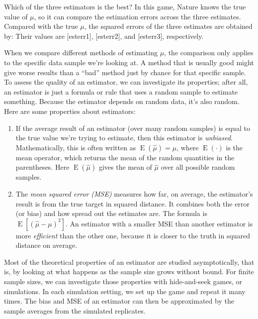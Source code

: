Which of the three estimators is the best? In this game, Nature knows the true
value of $\mu$, so it can compare the estimation errors across the three
estimates. Compared with the true $\mu$, the squared errors of the three
estimates are obtained by:
Their values are [esterr1],
[esterr2], and
[esterr3], respectively.


When we compare different methods of estimating $\mu$, the comparison only
applies to the specific data sample we're looking at. A method that is usually
good might give worse results than a ``bad'' method just by chance for that
specific sample.  To assess the quality of an estimator, we can investigate its
properties; after all, an estimator is just a formula or rule that uses a random
sample to estimate something. Because the estimator depends on random data, it's
also random. Here are some properties about estimators:
\begin{enumerate}
\item If the average result of an estimator (over many random samples) is equal
  to the true value we're trying to estimate, then this estimator is
  \emph{unbiased}.  Mathematically, this is often
  written as $\operatorname{E}(\hat{\mu}) = \mu$, where
  $\operatorname{E}(\cdot)$ is the mean operator, which returns the
  mean of the random quantities in the parentheses. Here
  $\operatorname{E}(\hat{\mu})$ gives the mean of $\hat{\mu}$ over all
  possible random samples.
\item The \emph{mean squared error (MSE)} measures how
  far, on average, the estimator's result is from the true target in
  squared distance. It combines
  both the error (or bias) and how spread out the estimates are. The formula is
  $\operatorname{E}[(\hat{\mu} - \mu)^2]$.
  An estimator with a smaller MSE than another estimator is more
  \emph{efficient} than the other one, because it
  is closer to the truth in squared distance on average.
\end{enumerate}

Most of the theoretical properties of an estimator are studied
asymptotically, that is, by looking at what happens as the sample size
grows without bound. For finite sample sizes, we can investigate those
properties with hide-and-seek games, or simulations. In each simulation
setting, we set up the game and repeat it many times. The bias and MSE
of an estimator can then be approximated by the sample averages from
the simulated replicates.


